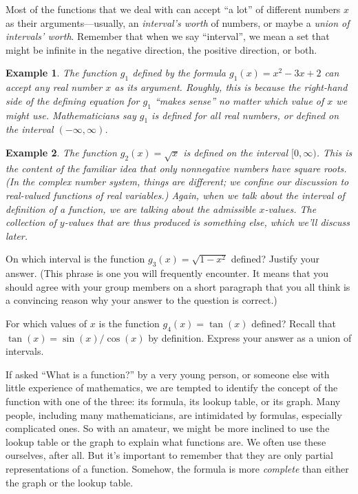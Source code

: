 \documentclass[justified]{tufte-handout}
\newtheorem{example}{Example}
\begin{document}
Most of the functions that we deal with can accept ``a lot'' of different numbers $x$ as their arguments---usually, an \emph{interval's worth} of numbers, or maybe a \emph{union of intervals' worth}. Remember that when we say ``interval'', we mean a set that might be infinite in the negative direction, the positive direction, or both.
\begin{example}
	The function $g_1$ defined by the formula $g_1(x) = x^2 - 3x + 2$ can accept any real number $x$ as its argument. Roughly, this is because the right-hand side of the defining equation for $g_1$ ``makes sense'' no matter which value of $x$ we might use. Mathematicians say $g_1$ is defined for all real numbers, or defined on the interval $(-\infty,\infty)$.
\end{example}
\begin{example}
	The function $g_2(x) = \sqrt{x}$ is defined on the interval $[0,\infty)$. This is the content of the familiar idea that only nonnegative numbers have square roots. (In the complex number system, things are different; we confine our discussion to real-valued functions of real variables.) Again, when we talk about the interval of definition of a function, we are talking about the admissible $x$-values. The collection of $y$-values that are thus produced is something else, which we'll discuss later.
\end{example}
\begin{marginnote}
	On which interval is the function $g_3(x) = \sqrt{1-x^2}$ defined? Justify your answer. (This phrase is one you will frequently encounter. It means that you should agree with your group members on a short paragraph that you all think is a convincing reason why your answer to the question is correct.)
\end{marginnote}
\begin{marginnote}
	For which values of $x$ is the function $g_4(x) = \tan(x)$ defined? Recall that $\tan(x) = \sin(x)/\cos(x)$ by definition. Express your answer as a union of intervals.
\end{marginnote}

If asked ``What is a function?'' by a very young person, or someone else with little experience of mathematics, we are tempted to identify the concept of the function with one of the three: its formula, its lookup table, or its graph. Many people, including many mathematicians, are intimidated by formulas, especially complicated ones. So with an amateur, we might be more inclined to use the lookup table or the graph to explain what functions are. We often use these ourselves, after all. But it's important to remember that they are only partial representations of a function. Somehow, the formula is more \emph{complete} than either the graph or the lookup table.
\end{document}
